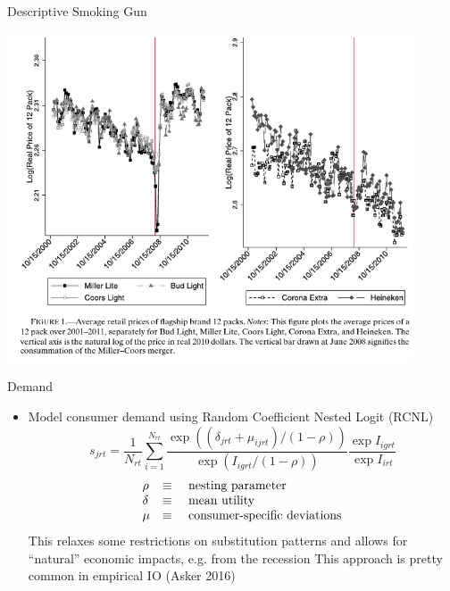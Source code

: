 \documentclass[dvipsnames]{beamer}
\begin{document}
\begin{frame}{Descriptive Smoking Gun}
  \begin{center}
    \includegraphics[width=0.9\textwidth, keepaspectratio=true]{fig1.png}
  \end{center}
\end{frame}
%
\begin{frame}{Demand}
  \begin{itemize}
  \item Model consumer demand using Random Coefficient Nested Logit (RCNL)
  \[
s_{jrt} = \frac{1}{N_{rt}}\sum^{N_{rt}}_{i = 1} \frac{\exp\left((\delta_{jrt} + \mu_{ijrt})/(1 - \rho)\right)}{\exp\left(I_{igrt}/(1 - \rho)\right)} \frac{\exp I_{igrt}}{\exp I_{irt}}
  \]
  \[
  \begin{array}[l]{lcl}
    \rho &\equiv & \text{ nesting parameter} \\
    \delta & \equiv & \text{ mean utility}\\
    \mu & \equiv & \text{ consumer-specific deviations}
  \end{array}
  \]
    \vitem This relaxes some restrictions on substitution patterns and allows for ``natural'' economic impacts, e.g. from the recession
\vitem This approach is pretty common in empirical IO (Asker 2016)
  \end{itemize}
\end{frame}
%
\end{document}
